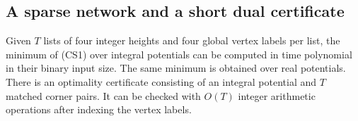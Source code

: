 \subsection{A sparse network and a short dual certificate}

\begin{theorem}
Given $T$ lists of four integer heights and four global vertex labels per
list, the minimum of \textup{(CS1)} over integral potentials can be computed
in time polynomial in their binary input size. The same minimum is obtained
over real potentials. There is an optimality certificate consisting of an
integral potential and $T$ matched corner pairs. It can be checked with
$O(T)$ integer arithmetic operations after indexing the vertex labels.
\end{theorem}

